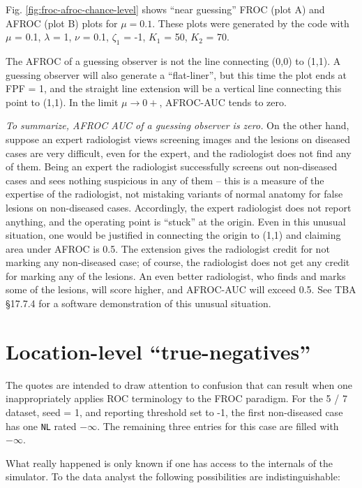 \documentclass[
]{book}
\begin{document}
Fig. \ref{fig:froc-afroc-chance-level} shows ``near guessing'' FROC (plot A) and AFROC (plot B) plots for \(\mu = 0.1\). These plots were generated by the code with \(\mu\) = 0.1, \(\lambda\) = 1, \(\nu\) = 0.1, \(\zeta_1\) = -1, \(K_1\) = 50, \(K_2\) = 70.

The AFROC of a guessing observer is not the line connecting (0,0) to (1,1). A guessing observer will also generate a ``flat-liner'', but this time the plot ends at FPF = 1, and the straight line extension will be a vertical line connecting this point to (1,1). In the limit \(\mu \rightarrow 0+\), AFROC-AUC tends to zero.

\emph{To summarize, AFROC AUC of a guessing observer is zero.} On the other hand, suppose an expert radiologist views screening images and the lesions on diseased cases are very difficult, even for the expert, and the radiologist does not find any of them. Being an expert the radiologist successfully screens out non-diseased cases and sees nothing suspicious in any of them -- this is a measure of the expertise of the radiologist, not mistaking variants of normal anatomy for false lesions on non-diseased cases. Accordingly, the expert radiologist does not report anything, and the operating point is ``stuck'' at the origin. Even in this unusual situation, one would be justified in connecting the origin to (1,1) and claiming area under AFROC is 0.5. The extension gives the radiologist credit for not marking any non-diseased case; of course, the radiologist does not get any credit for marking any of the lesions. An even better radiologist, who finds and marks some of the lesions, will score higher, and AFROC-AUC will exceed 0.5. See TBA §17.7.4 for a software demonstration of this unusual situation.

\hypertarget{location-level-true-negatives}{%
\section{Location-level ``true-negatives''}\label{location-level-true-negatives}}

The quotes are intended to draw attention to confusion that can result when one inappropriately applies ROC terminology to the FROC paradigm. For the 5 / 7 dataset, seed = 1, and reporting threshold set to -1, the first non-diseased case has one \texttt{NL} rated \ensuremath{-\infty{}}. The remaining three entries for this case are filled with \(-\infty\).

What really happened is only known if one has access to the internals of the simulator. To the data analyst the following possibilities are indistinguishable:
\end{document}
